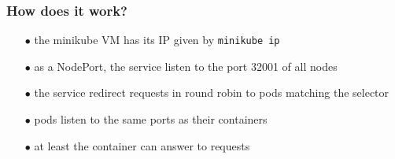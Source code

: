 	\begin{frame}[fragile]
		\frametitle{How does it work?}
		
		\begin{itemize}
			\item[$\bullet$] the minikube VM has its IP given by \verb!minikube ip!
			\item[$\bullet$] as a NodePort, the service listen to the port 32001 of all nodes
			\item[$\bullet$] the service redirect requests in round robin to pods matching the selector
			\item[$\bullet$] pods listen to the same ports as their containers
			\item[$\bullet$] at least the container can answer to requests
		\end{itemize}
	\end{frame}